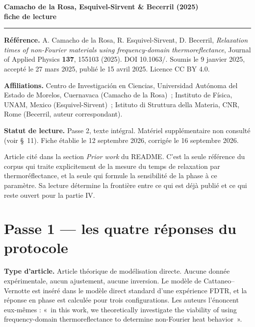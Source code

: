 \documentclass[11pt,a4paper]{article}
\newcommand{\sep}{\par\medskip\noindent{\color{filet}\rule{\linewidth}{0.6pt}}\par\medskip}
\begin{document}
{\sffamily\bfseries\LARGE Camacho de la Rosa, Esquivel-Sirvent \& Becerril (2025)\\[3pt]
\large fiche de lecture\par}
\vspace{4pt}
{\color{filet}\rule{\linewidth}{1pt}}
\vspace{6pt}

\textbf{Référence.} A. Camacho de la Rosa, R. Esquivel-Sirvent, D. Becerril,
\textit{Relaxation times of non-Fourier materials using frequency-domain thermoreflectance},
Journal of Applied Physics \textbf{137}, 155103 (2025). DOI 10.1063/.
Soumis le 9 janvier 2025, accepté le 27 mars 2025, publié le 15 avril 2025. Licence CC BY 4.0.

\textbf{Affiliations.} Centro de Investigación en Ciencias, Universidad Autónoma del Estado de
Morelos, Cuernavaca (Camacho de la Rosa)~; Instituto de Física, UNAM, Mexico
(Esquivel-Sirvent)~; Istituto di Struttura della Materia, CNR, Rome (Becerril, auteur
correspondant).

\textbf{Statut de lecture.} Passe 2, texte intégral. Matériel supplémentaire non consulté
(voir §~11). Fiche établie le 12 septembre 2026, corrigée le 16 septembre 2026.

Article cité dans la section \textit{Prior work} du README. C'est la seule référence du corpus
qui traite explicitement de la mesure du temps de relaxation par thermoréflectance, et la seule
qui formule la sensibilité de la phase à ce paramètre. Sa lecture détermine la frontière entre
ce qui est déjà publié et ce qui reste ouvert pour la partie IV.

\sep

\section{Passe 1 --- les quatre réponses du protocole}

\textbf{Type d'article.} Article théorique de modélisation directe. Aucune donnée
expérimentale, aucun ajustement, aucune inversion. Le modèle de Cattaneo--Vernotte est inséré
dans le modèle direct standard d'une expérience FDTR, et la réponse en phase est calculée pour
trois configurations. Les auteurs l'énoncent eux-mêmes : «~in this work, we theoretically
investigate the viability of using frequency-domain thermoreflectance to determine non-Fourier
heat behavior~».
\end{document}
